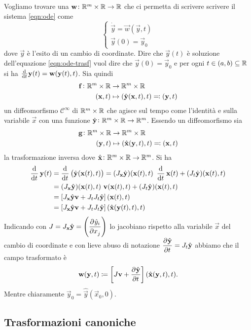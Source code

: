 Vogliamo trovare una $ \mathbf{w} \colon \mathbb{R}^m \times \mathbb{R} \to \mathbb{R} $ che ci permetta di scrivere scrivere il sistema \eqref{eqn:ode} come
\begin{equation} \label{eqn:ode-trasf}
    \begin{cases}
    \dot{\vec{y}} = \vec{w}(\vec{y}, t) \\
    \vec{y}(0) = \vec{y}_0
    \end{cases}
\end{equation}
dove $ \vec{y} $ è l'esito di un cambio di coordinate. Dire che $ \vec{y}(t) $ è soluzione dell'equazione \eqref{eqn:ode-trasf} vuol dire che $ \vec{y}(0) = \vec{y}_0 $ e per ogni $ t \in (a, b) \subseteq \mathbb{R} $ si ha $ \od{}{t} \vec{y}(t) = \vec{w}(\vec{y}(t), t) $. Sia quindi
\begin{align*}
    \mathbf{f} \colon \mathbb{R}^m \times \mathbb{R} & \to \mathbb{R}^m \times \mathbb{R} \\
    (\mathbf{x}, t) & \mapsto (\hat{\mathbf{y}}(\mathbf{x}, t), t) \eqqcolon (\mathbf{y}, t)
\end{align*}
un diffeomorfismo $ \mathcal{C}^\infty $  di $ \mathbb{R}^m \times \mathbb{R} $ che agisce sul tempo come l'identità e sulla variabile $ \vec{x} $ con una funzione $ \hat{\mathbf{y}} \colon \mathbb{R}^m \times \mathbb{R} \to \mathbb{R}^m $. Essendo un diffeomorfismo sia
\begin{align*}
    \mathbf{g} \colon \mathbb{R}^m \times \mathbb{R} & \to \mathbb{R}^m \times \mathbb{R} \\
    (\mathbf{y}, t) & \mapsto (\hat{\mathbf{x}}(\mathbf{y}, t), t) \eqqcolon (\mathbf{x}, t)
\end{align*}
la trasformazione inversa dove $ \hat{\mathbf{x}} \colon \mathbb{R}^m \times \mathbb{R} \to \mathbb{R}^m $. Si ha
\begin{align*}
    \dod{}{t} \vec{y}(t) & = \dod{}{t} \left( \hat{\vec{y}}(\vec{x}(t), t)\right) = (J_\vec{x} \hat{\vec{y}})(\vec{x}(t), t) \ \dod{}{t} \vec{x}(t)  + (J_t \hat{\vec{y}})(\vec{x}(t), t) \\
    & = (J_\vec{x} \hat{\vec{y}})(\vec{x}(t), t) \ \vec{v}(\vec{x}(t), t)  + (J_t \hat{\vec{y}})(\vec{x}(t), t) \\
    & = \left[J_\vec{x} \hat{\vec{y}} \vec{v} + J_t J_t \hat{\vec{y}}\right] (\vec{x}(t), t) \\
    & = \left[J_\vec{x} \hat{\vec{y}} \vec{v} + J_t J_t \hat{\vec{y}}\right] (\hat{\vec{x}}(\vec{y}(t), t), t)
\end{align*}
Indicando con $ J = J_\vec{x} \hat{\vec{y}} = \left(\dpd{\hat{y}_i}{x_j}\right) $ lo jacobiano rispetto alla variabile $ \vec{x} $ del cambio di coordinate e con lieve abuso di notazione $ \dpd{\hat{\vec{y}}}{t} = J_t \hat{\vec{y}} $ abbiamo che il campo trasformato è
\begin{equation}
    \vec{w}(\vec{y}, t) \coloneqq \left[ J \vec{v} + \dpd{\hat{\vec{y}}}{t}\right] (\hat{\vec{x}}(\vec{y}, t), t).
\end{equation}
Mentre chiaramente $ \vec{y}_0 = \hat{\vec{y}}(\vec{x}_0, 0) $.

\subsection{Trasformazioni canoniche}
